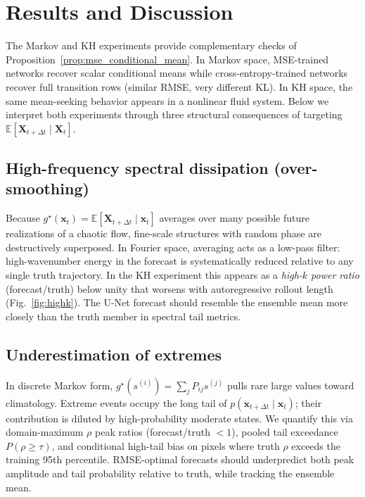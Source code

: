 
\section{Results and Discussion}
\label{sec:results_discussion}

The Markov and KH experiments provide complementary checks of Proposition~\ref{prop:mse_conditional_mean}.
In Markov space, MSE-trained networks recover scalar conditional means while cross-entropy-trained networks recover full transition rows (similar RMSE, very different KL).
In KH space, the same mean-seeking behavior appears in a nonlinear fluid system.
Below we interpret both experiments through three structural consequences of targeting $\mathbb{E}[\mathbf{X}_{t+\Delta t}\mid \mathbf{X}_t]$.

\subsection{High-frequency spectral dissipation (over-smoothing)}
\label{subsec:oversmoothing}

Because $g^\star(\mathbf{x}_t)=\mathbb{E}[\mathbf{X}_{t+\Delta t}\mid \mathbf{x}_t]$ averages over many possible future realizations of a chaotic flow, fine-scale structures with random phase are destructively superposed.
In Fourier space, averaging acts as a low-pass filter: high-wavenumber energy in the forecast is systematically reduced relative to any single truth trajectory.
In the KH experiment this appears as a \emph{high-$k$ power ratio} (forecast/truth) below unity that worsens with autoregressive rollout length (Fig.~\ref{fig:highk}).
The U-Net forecast should resemble the ensemble mean more closely than the truth member in spectral tail metrics.

\subsection{Underestimation of extremes}
\label{subsec:extremes}

In discrete Markov form, $g^\star(s^{(i)})=\sum_j P_{ij}s^{(j)}$ pulls rare large values toward climatology.
Extreme events occupy the long tail of $p(\mathbf{x}_{t+\Delta t}\mid \mathbf{x}_t)$; their contribution is diluted by high-probability moderate states.
We quantify this via domain-maximum $\rho$ peak ratios (forecast/truth $<1$), pooled tail exceedance $P(\rho\ge\tau)$, and conditional high-tail bias on pixels where truth $\rho$ exceeds the training 95th percentile.
RMSE-optimal forecasts should underpredict both peak amplitude and tail probability relative to truth, while tracking the ensemble mean.

